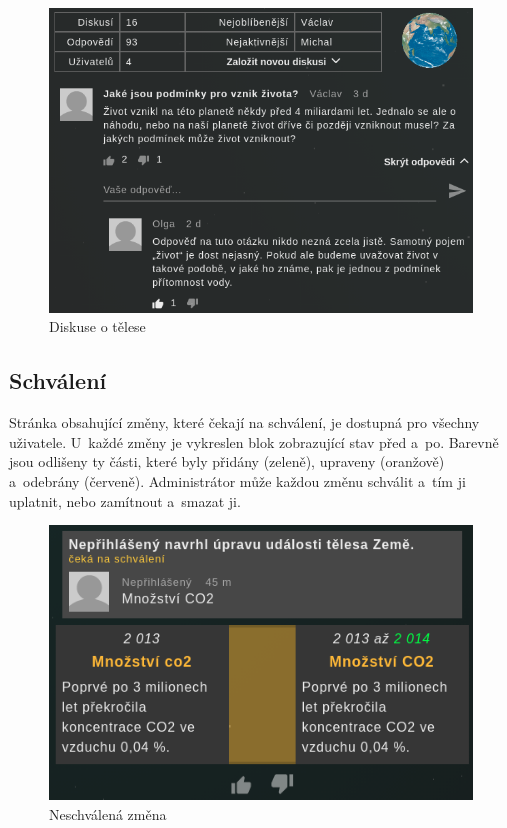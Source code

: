 \documentclass[a4paper,12pt]{article}
\begin{document}
\begin{figure}[H]
\begin{center}
\includegraphics[width=350pt]{Images/Discussion.png}
\caption{Diskuse o tělese}
\end{center}
\end{figure}

\vspace*{-1cm}
\subsection{Schválení}

Stránka obsahující změny, které čekají na schválení, je dostupná pro všechny uživatele. U~každé změny je vykreslen blok zobrazující stav před a~po. Barevně jsou odlišeny ty části, které byly přidány (zeleně), upraveny (oranžově) a~odebrány (červeně). Administrátor může každou změnu schválit a~tím ji uplatnit, nebo zamítnout a~smazat ji.

\begin{figure}[H]
\begin{center}
\includegraphics[width=350pt]{Images/Approval.png}
\caption{Neschválená změna}
\end{center}
\end{figure}
\end{document}
